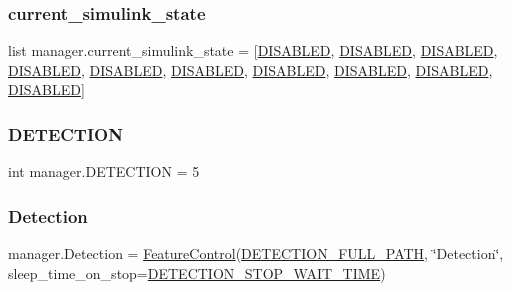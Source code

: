 \mbox{\label{namespacemanager_afe07b109c9d2316eff7e41a3e38d2859}} 
\subsubsection{\texorpdfstring{current\+\_\+simulink\+\_\+state}{current\_simulink\_state}}
{\footnotesize\ttfamily list manager.\+current\+\_\+simulink\+\_\+state = \mbox{[}\hyperlink{namespacemanager_acc1a242f79d4757ccec1eafa25991b69}{D\+I\+S\+A\+B\+L\+ED}, \hyperlink{namespacemanager_acc1a242f79d4757ccec1eafa25991b69}{D\+I\+S\+A\+B\+L\+ED}, \hyperlink{namespacemanager_acc1a242f79d4757ccec1eafa25991b69}{D\+I\+S\+A\+B\+L\+ED}, \hyperlink{namespacemanager_acc1a242f79d4757ccec1eafa25991b69}{D\+I\+S\+A\+B\+L\+ED}, \hyperlink{namespacemanager_acc1a242f79d4757ccec1eafa25991b69}{D\+I\+S\+A\+B\+L\+ED}, \hyperlink{namespacemanager_acc1a242f79d4757ccec1eafa25991b69}{D\+I\+S\+A\+B\+L\+ED}, \hyperlink{namespacemanager_acc1a242f79d4757ccec1eafa25991b69}{D\+I\+S\+A\+B\+L\+ED}, \hyperlink{namespacemanager_acc1a242f79d4757ccec1eafa25991b69}{D\+I\+S\+A\+B\+L\+ED}, \hyperlink{namespacemanager_acc1a242f79d4757ccec1eafa25991b69}{D\+I\+S\+A\+B\+L\+ED}, \hyperlink{namespacemanager_acc1a242f79d4757ccec1eafa25991b69}{D\+I\+S\+A\+B\+L\+ED}\mbox{]}}

\mbox{\label{namespacemanager_a341e1745be0eb2382da0ea818411441c}} 
\subsubsection{\texorpdfstring{D\+E\+T\+E\+C\+T\+I\+ON}{DETECTION}}
{\footnotesize\ttfamily int manager.\+D\+E\+T\+E\+C\+T\+I\+ON = 5}

\mbox{\label{namespacemanager_a9fe1a53a39fe1ece9045bed8a2f69092}} 
\subsubsection{\texorpdfstring{Detection}{Detection}}
{\footnotesize\ttfamily manager.\+Detection = \hyperlink{classFeatureControl_1_1FeatureControl}{Feature\+Control}(\hyperlink{namespacemanager_a6c770a978c4d514742b18d200aa5e09e}{D\+E\+T\+E\+C\+T\+I\+O\+N\+\_\+\+F\+U\+L\+L\+\_\+\+P\+A\+TH}, \char`\"{}Detection\char`\"{}, sleep\+\_\+time\+\_\+on\+\_\+stop=\hyperlink{namespacemanager_a38f231e60cb3e2fa5c7a738460ddad61}{D\+E\+T\+E\+C\+T\+I\+O\+N\+\_\+\+S\+T\+O\+P\+\_\+\+W\+A\+I\+T\+\_\+\+T\+I\+ME})}

